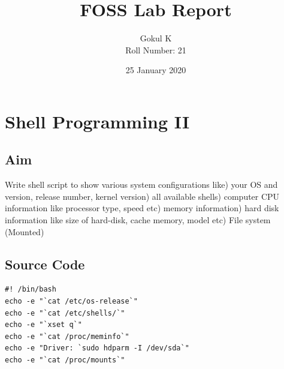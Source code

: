 \documentclass{article}
\begin{document}
\title{FOSS Lab Report}
\author{Gokul K\\[2\baselineskip]
Roll Number: 21\\[2\baselineskip]}
\date{25 January 2020}

\maketitle

\setcounter{section}{4}
\section{Shell Programming II}
\subsection{Aim}
Write shell script to show various system configurations like) your OS and version, release number, kernel version) all available shells) computer CPU information like processor type, speed etc) memory information) hard disk information like size of hard-disk, cache memory, model etc) File system (Mounted)\newline
\subsection{Source Code}
\begin{verbatim}
#! /bin/bash
echo -e "`cat /etc/os-release`"
echo -e "`cat /etc/shells/`"
echo -e "`xset q`"
echo -e "`cat /proc/meminfo`"
echo -e "Driver: `sudo hdparm -I /dev/sda`"
echo -e "`cat /proc/mounts`"
\end{verbatim}
\end{document}
